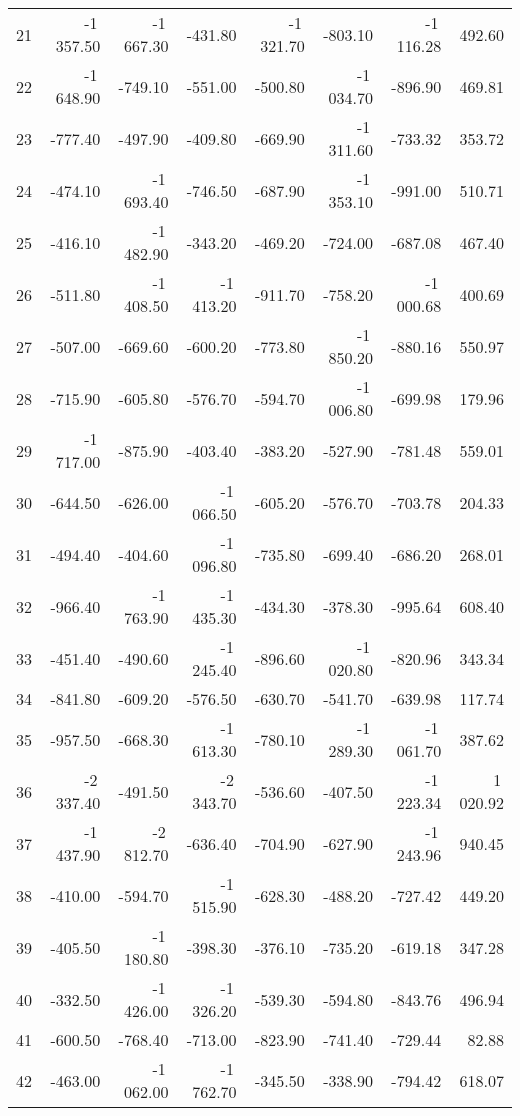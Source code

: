 \begin{longtable}{rrrrrrrr}
21 & -1\,357.50 & -1\,667.30 & -431.80 & -1\,321.70 & -803.10 & -1\,116.28 & 492.60  \\
22 & -1\,648.90 & -749.10 & -551.00 & -500.80 & -1\,034.70 & -896.90 & 469.81  \\
23 & -777.40 & -497.90 & -409.80 & -669.90 & -1\,311.60 & -733.32 & 353.72  \\
24 & -474.10 & -1\,693.40 & -746.50 & -687.90 & -1\,353.10 & -991.00 & 510.71  \\
25 & -416.10 & -1\,482.90 & -343.20 & -469.20 & -724.00 & -687.08 & 467.40  \\
26 & -511.80 & -1\,408.50 & -1\,413.20 & -911.70 & -758.20 & -1\,000.68 & 400.69  \\
27 & -507.00 & -669.60 & -600.20 & -773.80 & -1\,850.20 & -880.16 & 550.97  \\
28 & -715.90 & -605.80 & -576.70 & -594.70 & -1\,006.80 & -699.98 & 179.96  \\
29 & -1\,717.00 & -875.90 & -403.40 & -383.20 & -527.90 & -781.48 & 559.01  \\
30 & -644.50 & -626.00 & -1\,066.50 & -605.20 & -576.70 & -703.78 & 204.33  \\
31 & -494.40 & -404.60 & -1\,096.80 & -735.80 & -699.40 & -686.20 & 268.01  \\
32 & -966.40 & -1\,763.90 & -1\,435.30 & -434.30 & -378.30 & -995.64 & 608.40  \\
33 & -451.40 & -490.60 & -1\,245.40 & -896.60 & -1\,020.80 & -820.96 & 343.34  \\
34 & -841.80 & -609.20 & -576.50 & -630.70 & -541.70 & -639.98 & 117.74  \\
35 & -957.50 & -668.30 & -1\,613.30 & -780.10 & -1\,289.30 & -1\,061.70 & 387.62  \\
36 & -2\,337.40 & -491.50 & -2\,343.70 & -536.60 & -407.50 & -1\,223.34 & 1\,020.92  \\
37 & -1\,437.90 & -2\,812.70 & -636.40 & -704.90 & -627.90 & -1\,243.96 & 940.45  \\
38 & -410.00 & -594.70 & -1\,515.90 & -628.30 & -488.20 & -727.42 & 449.20  \\
39 & -405.50 & -1\,180.80 & -398.30 & -376.10 & -735.20 & -619.18 & 347.28  \\
40 & -332.50 & -1\,426.00 & -1\,326.20 & -539.30 & -594.80 & -843.76 & 496.94  \\
41 & -600.50 & -768.40 & -713.00 & -823.90 & -741.40 & -729.44 & 82.88  \\
42 & -463.00 & -1\,062.00 & -1\,762.70 & -345.50 & -338.90 & -794.42 & 618.07  \\

\end{longtable}
